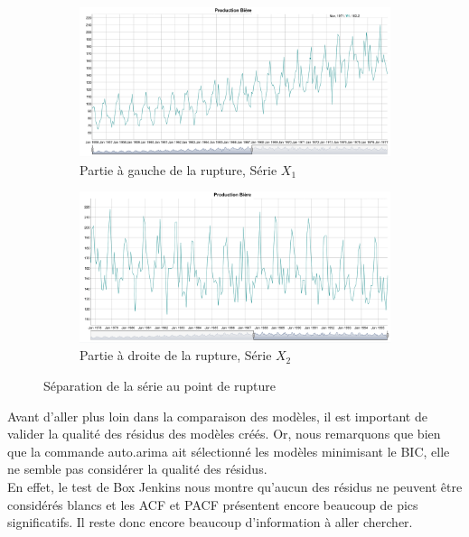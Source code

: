 \documentclass[12pt,a4paper]{book}
\newcommand{\1}{\mathds{1}}
\begin{document}
\vspace{5 mm}
\begin{figure}[h]
	\begin{subfigure}{.5\textwidth}
  		\centering
    	\includegraphics[width=\textwidth]{rupture1}  
    	\caption{Partie à gauche de la rupture, Série $X_1$}
    	\label{fig:sub1}
    \end{subfigure}
    \begin{subfigure}{.5\textwidth}
    	\centering
    	\includegraphics[width=\textwidth]{rupture2}  
    	\caption{Partie à droite de la rupture, Série $X_2$}
    	\label{fig:sub2}
    \end{subfigure}

\caption{Séparation de la série au point de rupture}
\label{fig:3}
\end{figure}

\vspace{15 mm}
Avant d'aller plus loin dans la comparaison des modèles, il est important de valider la qualité des résidus des modèles créés. Or, nous remarquons que bien que la commande auto.arima ait sélectionné les modèles minimisant le BIC, elle ne semble pas considérer la qualité des résidus. \\
En effet, le test de Box Jenkins nous montre qu'aucun des résidus ne peuvent être considérés blancs et les ACF et PACF présentent encore beaucoup de pics significatifs. Il reste donc encore beaucoup d'information à aller chercher. \\
\end{document}
